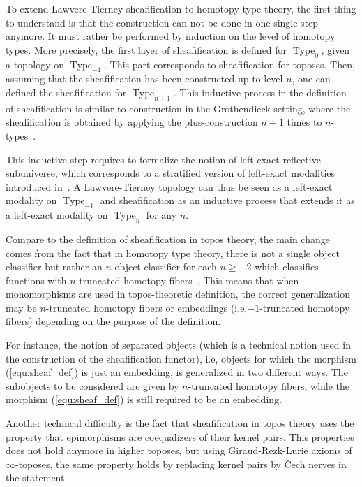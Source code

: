\documentclass[conference]{IEEEtran}
\newcommand{\ie}{i.e,\xspace}
\DeclareMathOperator{\Type}{Type}
\begin{document}
To extend Lawvere-Tierney sheafification to homotopy type theory, the
first thing to understand is that the construction can not be done in one
single step anymore. It must rather be performed by induction on the
level of homotopy types. More precisely, the first layer of
sheafification is defined for $\Type_{0}$, given a topology on
$\Type_{-1}$. This part corresponds to sheafification for toposes. Then,
assuming that the sheafification has been constructed up to level $n$,
one can defined the sheafification for $\Type_{n+1}$.
%
This inductive process in the definition of sheafification is similar
to construction in the Grothendieck setting, where the
sheafification is obtained by applying the plus-construction $n+1$
times to
$n$-types~\cite[Chapter~6]{lurie}.

This inductive step requires to formalize the notion of left-exact
reflective subuniverse, which corresponds to a stratified version of
left-exact modalities introduced in~\cite[Chapter~7]{hottbook}. A
Lawvere-Tierney topology can thus be seen as a left-exact modality on
$\Type_{-1}$ and sheafification as an inductive process that extends
it as a left-exact modality on $\Type_{n}$ for any $n$.

Compare to the definition of sheafification in topos theory, the main
change comes from the fact that in homotopy type theory, there is not
a single object classifier but rather an $n$-object classifier for
each $n\geq -2$ which classifies functions with $n$-truncated homotopy
fibers~\cite{sets_in_hott}. This means that when monomorphisms are used in topos-theoretic definition, the correct generalization may be $n$-truncated homotopy
fibers or embeddings (\ie $-1$-truncated homotopy
fibers) depending on the purpose of the definition.

For instance, the notion of separated objects (which is a technical
notion used in the construction of the sheafification functor), \ie
objects for which the morphism
(\ref{equ:sheaf_def}) is just an embedding, is generalized in two
different ways.  
%
The subobjects to be considered are given by $n$-truncated homotopy fibers,
while the morphism (\ref{equ:sheaf_def}) is still required to be an
embedding.

Another technical difficulty is the fact that sheafification in topos
theory uses the property that epimorphisms are coequalizers of their
kernel pairs. This properties does not hold anymore in higher toposes, but
using Giraud-Rezk-Lurie axioms of $\infty$-toposes, the same property
holds by replacing kernel pairs by \v{C}ech nerves in the statement.
\end{document}
